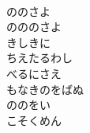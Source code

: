 \documentclass[10pt,b5j]{tarticle} %
\begin{document}
\begin{enumerate}
\begin{minipage}[c]{\blocksize}
    \end{minipage}
    \begin{minipage}[c]{\blocksize}
        
        \vspace{\linespace}
        \item~\\
        ののさよ\\
        のののさよ\\
        きしきに\\
        ちえたるわし\\
        べるにさえ\\
        もなきのをばぬ\\
        ののをい\\
        こそくめん
    
    \end{minipage}
\end{enumerate} %
\end{document}
